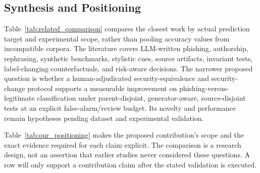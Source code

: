 \subsection{Synthesis and Positioning}
Table~\ref{tab:related_comparison} compares the closest work by actual prediction target and experimental scope, rather than pooling accuracy values from incompatible corpora. The literature covers LLM-written phishing, authorship, rephrasing, synthetic benchmarks, stylistic cues, source artifacts, invariant tests, label-changing counterfactuals, and risk-aware decisions. The narrower proposed question is whether a human-adjudicated security-equivalence and security-change protocol supports a measurable improvement on phishing-versus-legitimate classification under parent-disjoint, generator-aware, source-disjoint tests at an explicit false-alarm/review budget. Its novelty and performance remain hypotheses pending dataset and experimental validation.

Table~\ref{tab:our_positioning} makes the proposed contribution's
scope and the exact evidence required for each claim explicit. The
comparison is a research design, not an assertion that earlier studies
never considered these questions. A row will only support a contribution
claim after the stated validation is executed.

